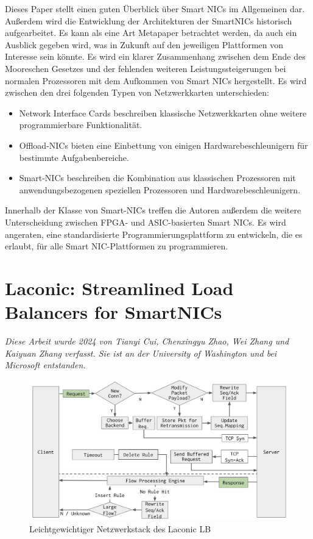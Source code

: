 Dieses Paper stellt einen guten Überblick über Smart NICs im Allgemeinen dar. Außerdem wird die Entwicklung der Architekturen der SmartNICs historisch aufgearbeitet. Es kann als eine Art Metapaper betrachtet werden, da auch ein Ausblick gegeben wird, was in Zukunft auf den jeweiligen Plattformen von Interesse sein könnte. Es wird ein klarer Zusammenhang zwischen dem Ende des Mooreschen Gesetzes und der fehlenden weiteren Leistungssteigerungen bei normalen Prozessoren mit dem Aufkommen von Smart NICs hergestellt. Es wird zwischen den drei folgenden Typen von Netzwerkkarten unterschieden:
\begin{itemize}
    \item Network Interface Cards beschreiben klassische Netzwerkkarten ohne weitere programmierbare Funktionalität.
    \item Offload-NICs bieten eine Einbettung von einigen Hardwarebeschleunigern für bestimmte Aufgabenbereiche.
    \item Smart-NICs beschreiben die Kombination aus klassischen Prozessoren mit anwendungsbezogenen speziellen Prozessoren und Hardwarebeschleunigern.
\end{itemize}
Innerhalb der Klasse von Smart-NICs treffen die Autoren außerdem die weitere Unterscheidung zwischen FPGA- und ASIC-basierten Smart NICs. Es wird angeraten, eine standardisierte Programmierungsplattform zu entwickeln, die es erlaubt, für alle Smart NIC-Plattformen zu programmieren.
\section{Laconic: Streamlined Load Balancers for SmartNICs}
\textit{Diese Arbeit wurde 2024 von Tianyi Cui, Chenxingyu Zhao, Wei Zhang und Kaiyuan Zhang  verfasst. Sie ist an der University of Washington und bei Microsoft entstanden.}\cite{cui2024laconic}
\begin{figure}
    \centering
    \includegraphics[width=1\linewidth]{images/laconic_workflow_v1.png}
    \caption{Leichtgewichtiger Netzwerkstack des Laconic LB}
    \label{fig:enter-label}
\end{figure}

